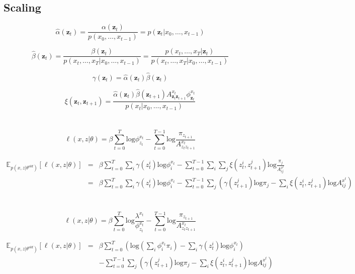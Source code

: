 \documentclass[11pt]{article}
\begin{document}
\subsection{Scaling}

\[
\hat{\alpha}(\mathbf{z}_t) = \frac{\alpha(\mathbf{z}_t)}{p(x_0,\ldots,x_{t-1})} = p(\mathbf{z}_t|x_0,\ldots,x_{t-1})
\]

\[
\hat{\beta}(\mathbf{z}_t) = \frac{\beta(\mathbf{z}_t)}{p(x_t,\ldots,x_T|x_0,\ldots,x_{t-1})} = \frac{p(x_t,\ldots,x_T|\mathbf{z}_t)}{p(x_t,\ldots,x_T|x_0,\ldots,x_{t-1})}
\]

\[
\gamma(\mathbf{z}_t) = \hat{\alpha}(\mathbf{z}_t)\hat{\beta}(\mathbf{z}_t)
\]

\[
\xi(\mathbf{z}_t,\mathbf{z}_{t+1}) = \frac{\hat{\alpha}(\mathbf{z}_t)\hat{\beta}(\mathbf{z}_{t+1})A^{x_t}_{\mathbf{z}_t\mathbf{z}_{t+1}}\phi^{x_t}_{\mathbf{z}_t}}{p(x_t|x_0,\ldots,x_{t-1})}
\]

\section{}

\[
\ell(x,z|\theta) = \beta \sum_{t=0}^T \mathrm{log}\phi^{x_t}_{z_t} - \sum_{t=0}^{T-1} \mathrm{log}\frac{\pi_{z_{t+1}}}{A^{x_t}_{z_t z_{t+1}}}
\]

\begin{eqnarray*}
\mathbb{E}_{p(x,z|\theta^{old})}[\ell(x,z|\theta)] & = & \beta\sum_{t=0}^T\sum_i \gamma(z_t^i) \mathrm{log}\phi_{i}^{x_t} - \sum_{t=0}^{T-1}\sum_i\sum_j \xi(z_{t}^i,z_{t+1}^j)\mathrm{log}\frac{\pi_j}{A^{x^t}_{ij}} \\
& = & \beta\sum_{t=0}^T\sum_i \gamma(z_t^i) \mathrm{log}\phi_{i}^{x_t} - \sum_{t=0}^{T-1}\sum_j \left(\gamma(z_{t+1}^j)\mathrm{log}\pi_j - \sum_i \xi(z_{t}^i,z_{t+1}^j)\mathrm{log}A^{x^t}_{ij}\right)
\end{eqnarray*}

\section{}

\[
\ell(x,z|\theta) = \beta \sum_{t=0}^T \mathrm{log}\frac{\lambda^{x_t}}{\phi^{x_t}_{z_t}} - \sum_{t=0}^{T-1} \mathrm{log}\frac{\pi_{z_{t+1}}}{A^{x_t}_{z_t z_{t+1}}}
\]

\begin{eqnarray*}
\mathbb{E}_{p(x,z|\theta^{old})}[\ell(x,z|\theta)] & = & \beta\sum_{t=0}^T \left(\mathrm{log}(\sum_i \phi_i^{x_t}\pi_i) - \sum_i \gamma(z_t^i) \mathrm{log}\phi_{i}^{x_t}\right) \\
& & - \sum_{t=0}^{T-1}\sum_j \left(\gamma(z_{t+1}^j)\mathrm{log}\pi_j - \sum_i \xi(z_{t}^i,z_{t+1}^j)\mathrm{log}A^{x^t}_{ij}\right)
\end{eqnarray*}
\end{document}
